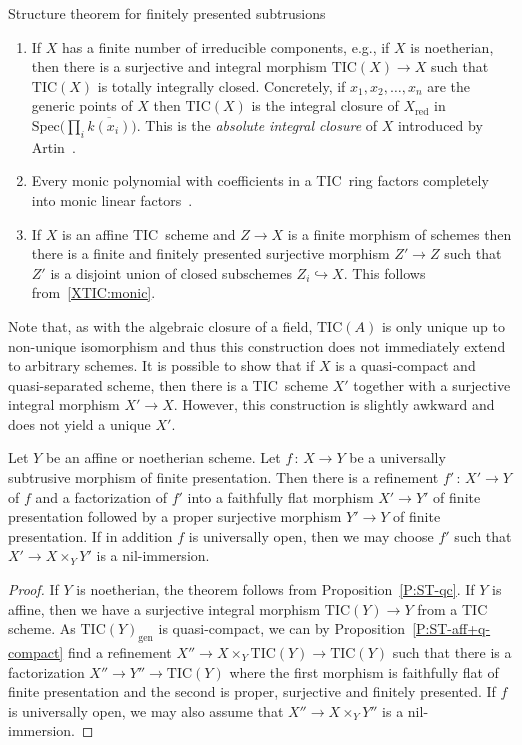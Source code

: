 \documentclass[a4paper,twoside,11pt]{amsart}[2009/07/02] %
\newcommand{\pref}[1]{\eqref{#1}}
\newcommand{\inj}{\hookrightarrow}
\newcommand{\map}[3]{#1\,:\, #2\rightarrow #3}
\newcommand{\Spec}{\mathrm{Spec}}
\newcommand{\genpts}{\mathrm{gen}} %
\newcommand{\red}{\mathrm{red}}
\newcommand{\TIC}{\mathrm{TIC}}
\begin{document}
\begin{section}{Structure theorem for finitely presented subtrusions}
\begin{properties}
\begin{enumerate}
homomorphism into a totally integrally closed ring $\TIC(A)$,
cf.~\cite[p.~769]{hochster_TIC}. If $X=\Spec(A)$ then we denote the
corresponding TIC~scheme with $\TIC(X)=\Spec(\TIC(A))$. For an arbitrary affine
scheme $X$ we let $\TIC(X)=\TIC(X_\red)$.
%
\item If $X$ has a finite number of irreducible components, e.g., if $X$ is
noetherian, then there is a surjective and integral morphism $\TIC(X)\to X$
such that $\TIC(X)$ is totally integrally closed. Concretely, if
$x_1,x_2,\dots,x_n$ are the generic points of $X$ then $\TIC(X)$ is the
integral closure of $X_\red$ in $\Spec\bigl(\prod_i \overline{k(x_i)}\bigr)$. This is the
\emph{absolute integral closure} of $X$ introduced by
Artin~\cite[\S1]{artin_Hensel-join}.
%
\item Every monic polynomial with coefficients in a TIC~ring factors
completely into monic linear factors~\cite[p.~769]{hochster_TIC}.
\label{XTIC:monic}
%
\item If $X$ is an affine TIC~scheme and $Z\to X$ is a finite morphism of
schemes then there is a finite and finitely presented surjective morphism
$Z'\to Z$ such that $Z'$ is a disjoint union of closed subschemes
$Z_i\inj X$. This follows from~\ref{XTIC:monic}.
\label{XTIC:closed-cover}
%
\end{enumerate}
%
Note that, as with the algebraic closure of a field, $\TIC(A)$ is only unique
up to non-unique isomorphism and thus this construction does not immediately
extend to arbitrary schemes. It is possible to show that if $X$ is a
quasi-compact and quasi-separated scheme, then there is a TIC~scheme $X'$
together with a surjective integral morphism $X'\to X$. However, this
construction is slightly awkward and does not yield a unique $X'$.
\end{properties}

\begin{theorem}\label{T:ST-aff}
Let $Y$ be an affine or noetherian scheme. Let $\map{f}{X}{Y}$ be a universally
subtrusive morphism of finite presentation. Then there is a refinement
$\map{f'}{X'}{Y}$ of $f$ and a factorization of $f'$ into a faithfully flat
morphism $X'\to Y'$ of finite presentation followed by a proper surjective
morphism $Y'\to Y$ of finite presentation. If in addition $f$ is universally
open, then we may choose $f'$ such that $X'\to X\times_Y Y'$ is a
nil-immersion.
\end{theorem}
\begin{proof}
If $Y$ is noetherian, the theorem follows from Proposition~\pref{P:ST-qc}. If
$Y$ is affine, then we have a surjective integral morphism $\TIC(Y)\to Y$ from
a TIC scheme. As $\TIC(Y)_\genpts$ is quasi-compact, we can by
Proposition~\pref{P:ST-aff+q-compact} find a refinement $X''\to X\times_Y
\TIC(Y)\to\TIC(Y)$ such that there is a factorization $X''\to Y''\to \TIC(Y)$
where the first morphism is faithfully flat of finite presentation and the
second is proper, surjective and finitely presented. If $f$ is universally
open, we may also assume that $X''\to X\times_Y Y''$ is a nil-immersion.


\end{proof}
\end{section}
\end{document}
